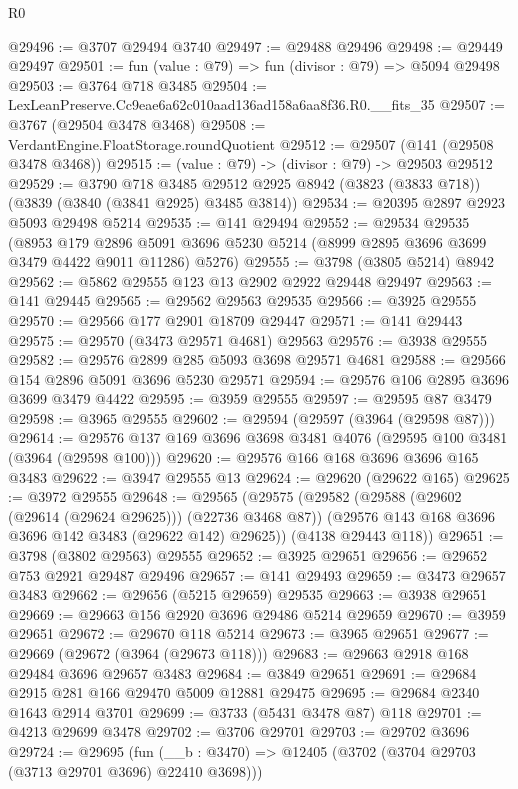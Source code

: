 \begin{lexlean}{R0}
\begin{coremodule}
@29496 := @3707 @29494 @3740
@29497 := @29488 @29496
@29498 := @29449 @29497
@29501 := fun (value : @79) => fun (divisor : @79) => @5094 @29498
@29503 := @3764 @718 @3485
@29504 := LexLeanPreserve.Cc9eae6a62c010aad136ad158a6aa8f36.R0.__fits_35
@29507 := @3767 (@29504 @3478 @3468)
@29508 := VerdantEngine.FloatStorage.roundQuotient
@29512 := @29507 (@141 (@29508 @3478 @3468))
@29515 := (value : @79) -> (divisor : @79) -> @29503 @29512
@29529 := @3790
    @718
    @3485
    @29512
    @2925
    @8942
    (@3823 (@3833 @718))
    (@3839 (@3840 (@3841 @2925) @3485 @3814))
@29534 := @20395 @2897 @2923 @5093 @29498 @5214
@29535 := @141 @29494
@29552 := @29534
    @29535
    (@8953
      @179
      @2896
      @5091
      @3696
      @5230
      @5214
      (@8999 @2895 @3696 @3699 @3479 @4422 @9011 @11286)
      @5276)
@29555 := @3798 (@3805 @5214) @8942
@29562 := @5862 @29555 @123 @13 @2902 @2922 @29448 @29497
@29563 := @141 @29445
@29565 := @29562 @29563 @29535
@29566 := @3925 @29555
@29570 := @29566 @177 @2901 @18709 @29447
@29571 := @141 @29443
@29575 := @29570 (@3473 @29571 @4681) @29563
@29576 := @3938 @29555
@29582 := @29576 @2899 @285 @5093 @3698 @29571 @4681
@29588 := @29566 @154 @2896 @5091 @3696 @5230 @29571
@29594 := @29576 @106 @2895 @3696 @3699 @3479 @4422
@29595 := @3959 @29555
@29597 := @29595 @87 @3479
@29598 := @3965 @29555
@29602 := @29594 (@29597 (@3964 (@29598 @87)))
@29614 := @29576 @137 @169 @3696 @3698 @3481 @4076 (@29595 @100 @3481 (@3964 (@29598 @100)))
@29620 := @29576 @166 @168 @3696 @3696 @165 @3483
@29622 := @3947 @29555 @13
@29624 := @29620 (@29622 @165)
@29625 := @3972 @29555
@29648 := @29565
    (@29575
      (@29582
        (@29588 (@29602 (@29614 (@29624 @29625))) (@22736 @3468 @87))
        (@29576 @143 @168 @3696 @3696 @142 @3483 (@29622 @142) @29625))
      (@4138 @29443 @118))
@29651 := @3798 (@3802 @29563) @29555
@29652 := @3925 @29651
@29656 := @29652 @753 @2921 @29487 @29496
@29657 := @141 @29493
@29659 := @3473 @29657 @3483
@29662 := @29656 (@5215 @29659) @29535
@29663 := @3938 @29651
@29669 := @29663 @156 @2920 @3696 @29486 @5214 @29659
@29670 := @3959 @29651
@29672 := @29670 @118 @5214
@29673 := @3965 @29651
@29677 := @29669 (@29672 (@3964 (@29673 @118)))
@29683 := @29663 @2918 @168 @29484 @3696 @29657 @3483
@29684 := @3849 @29651
@29691 := @29684 @2915 @281 @166 @29470 @5009 @12881 @29475
@29695 := @29684 @2340 @1643 @2914 @3701
@29699 := @3733 (@5431 @3478 @87) @118
@29701 := @4213 @29699 @3478
@29702 := @3706 @29701
@29703 := @29702 @3696
@29724 := @29695
    (fun (__b : @3470) => @12405 (@3702 (@3704 @29703 (@3713 @29701 @3696) @22410 @3698)))

\end{coremodule}
\end{lexlean}
